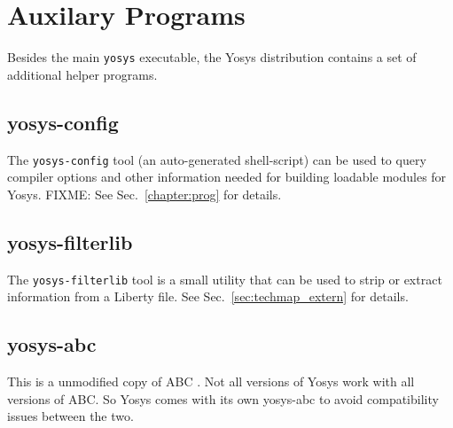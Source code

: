 
\chapter{Auxilary Programs}

Besides the main {\tt yosys} executable, the Yosys distribution contains a set
of additional helper programs.

\section{yosys-config}

The {\tt yosys-config} tool (an auto-generated shell-script) can be used to
query compiler options and other information needed for building loadable
modules for Yosys. FIXME: See Sec.~\ref{chapter:prog} for details.

\section{yosys-filterlib}
\label{sec:filterlib}

The {\tt yosys-filterlib} tool is a small utility that can be used to strip
or extract information from a Liberty file. See Sec.~\ref{sec:techmap_extern}
for details.

\section{yosys-abc}

This is a unmodified copy of ABC . Not all versions of Yosys
work with all versions of ABC. So Yosys comes with its own yosys-abc to avoid
compatibility issues between the two.

